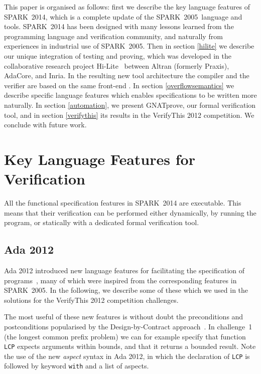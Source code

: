\documentclass[sttt,final]{svjour}
\newcommand{\hilite}{Hi-Lite}
\newcommand{\oldspark}{SPARK~2005\xspace}
\newcommand{\newspark}{SPARK~2014\xspace}
\begin{document}
This paper is organised as follows: first we describe the key language
features of \newspark, which is a complete update of the \oldspark\
language and tools. \newspark has been designed with many lessons
learned from the programming language and verification community, and
naturally from experiences in industrial use of \oldspark. Then in
section \ref{hilite} we describe our unique integration of testing and
proving, which was developed in the collaborative research project
\hilite\ \cite{hiliteERTS2012} between Altran (formerly Praxis),
AdaCore, and Inria. In the resulting new tool architecture the
compiler and the verifier are based on the same front-end
\cite{ksd2012}. In section \ref{overflowsemantics} we describe
specific language features which enables specifications to be written
more naturally. In section \ref{automation}, we present GNATprove, our
formal verification tool, and in
section \ref{verifythis} its results in the VerifyThis 2012
competition. We conclude with future work.

\section{Key Language Features for Verification}
\label{langfeatures}

All the functional specification features in \newspark are executable. This
means that their verification can be performed either dynamically, by running
the program, or statically with a dedicated formal verification tool.

\subsection{Ada 2012}

Ada 2012 introduced new language features for facilitating the
specification of programs~\cite{ada2012rationale}, many of which were
inspired from the corresponding features in \oldspark. In the following,
we describe some of these which we used in the solutions for the
VerifyThis 2012 competition challenges.

The most useful of these new features is without doubt the
preconditions and postconditions popularised by the Design-by-Contract
approach~\cite{meyer:1988:OSC}. In challenge~1 (the longest common
prefix problem) we can for example specify that function \verb|LCP|
expects arguments within bounds, and that it returns a bounded
result. Note the use of the new \textit{aspect} syntax in Ada 2012, in
which the declaration of \verb|LCP| is followed by keyword \verb|with|
and a list of aspects.
\end{document}
